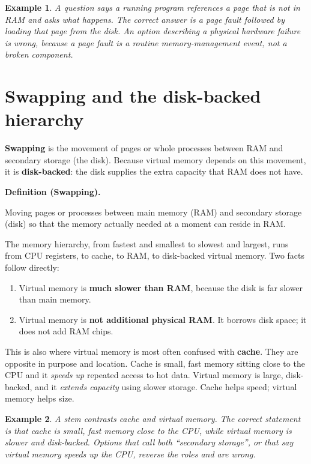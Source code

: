 \documentclass[11pt]{article}
\newtheorem{example}{Example}[section]
\newenvironment{definitionbox}[1]{%
  \par\noindent\textbf{Definition (#1).}\ \itshape
}{\par\vspace{0.3em}}
\begin{document}
\begin{example}
A question says a running program references a page that is not in RAM and asks
what happens. The correct answer is a page fault followed by loading that page
from the disk. An option describing a physical hardware failure is wrong,
because a page fault is a routine memory-management event, not a broken
component.
\end{example}

\section{Swapping and the disk-backed hierarchy}
\textbf{Swapping} is the movement of pages or whole processes between RAM and
secondary storage (the disk). Because virtual memory depends on this movement,
it is \textbf{disk-backed}: the disk supplies the extra capacity that RAM does
not have.

\begin{definitionbox}{Swapping}
Moving pages or processes between main memory (RAM) and secondary storage
(disk) so that the memory actually needed at a moment can reside in RAM.
\end{definitionbox}

The memory hierarchy, from fastest and smallest to slowest and largest, runs
from CPU registers, to cache, to RAM, to disk-backed virtual memory. Two facts
follow directly:
\begin{enumerate}
  \item Virtual memory is \textbf{much slower than RAM}, because the disk is far
    slower than main memory.
  \item Virtual memory is \textbf{not additional physical RAM}. It borrows disk
    space; it does not add RAM chips.
\end{enumerate}

This is also where virtual memory is most often confused with \textbf{cache}.
They are opposite in purpose and location. Cache is small, fast memory sitting
close to the CPU and it \emph{speeds up} repeated access to hot data. Virtual
memory is large, disk-backed, and it \emph{extends capacity} using slower
storage. Cache helps speed; virtual memory helps size.

\begin{example}
A stem contrasts cache and virtual memory. The correct statement is that cache
is small, fast memory close to the CPU, while virtual memory is slower and
disk-backed. Options that call both ``secondary storage'', or that say virtual
memory speeds up the CPU, reverse the roles and are wrong.
\end{example}
\end{document}
